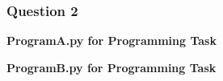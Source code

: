 \documentclass[12pt, a4paper]{article}
\begin{document}
\subsubsection*{Question 2}

	

\pagebreak
\textbf{Program\textunderscore A.py for Programming Task}\centering\label{Program_A}

\vspace{2cm}

\pagebreak
\textbf{Program\textunderscore B.py for Programming Task}\centering\label{Program_B}

\vspace{2cm}
\end{document}
